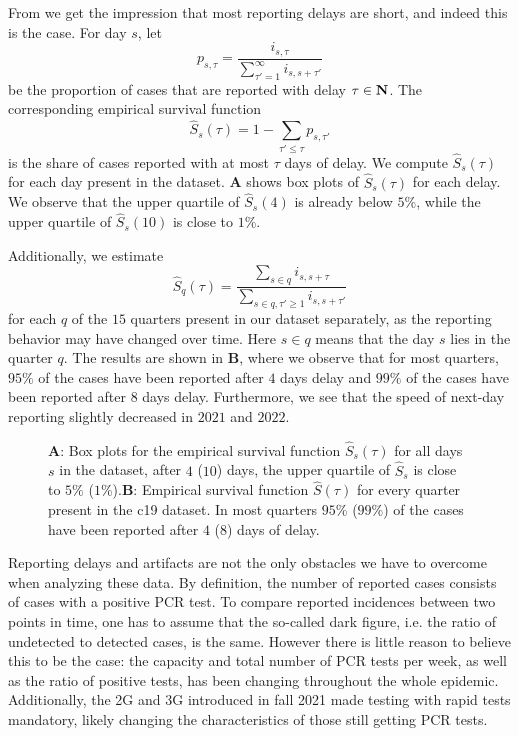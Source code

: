 From  we get the impression that most reporting delays are short, and indeed this is the case. For day $s$, let
$$
    p_{s,\tau} = \frac{i_{s,\tau}}{\sum_{\tau' = 1}^\infty i_{s,s + \tau'}}
$$
be the proportion of cases that are reported with delay $\tau \in\mathbf N$. The corresponding empirical survival function 
$$
    \hat S_{s}(\tau) = 1 - \sum_{\tau' \leq \tau} p_{s,\tau'}
$$
is the share of cases reported with at most $\tau$ days of delay. We compute $\hat S_s(\tau)$ for each day present in the dataset.  \textbf{A} shows box plots of $\hat S_{s}(\tau)$ for each delay. We observe that the upper quartile of $\hat S_s(4)$ is already below $5\%$, while the upper quartile of $\hat S_s(10)$ is close to $1\%$. 

Additionally, we estimate 
$$
    \hat S_{q}(\tau) = \frac{\sum_{s \in q} i_{s,s + \tau}}{\sum_{s \in q, \tau' \geq 1} i_{s, s+ \tau'}}
$$
for each $q$ of the $15$ quarters present in our dataset separately, as the reporting behavior may have changed over time. Here $s\in q$ means that the day $s$ lies in the quarter $q$. The results are shown in  \textbf{B}, where we observe that for most quarters, $95\%$ of the cases have been reported after $4$ days delay and $99\%$ of the cases have been reported after $8$ days delay. 
Furthermore, we see that the speed of next-day reporting slightly decreased in $2021$ and $2022$.

\begin{figure}
    \resizebox{\textwidth}{!}{%
    }
    \caption{\textbf{A}: Box plots for the empirical survival function $\hat S_{s}(\tau)$ for all days $s$ in the dataset, after $4$ ($10$) days, the upper quartile of $\hat S_{s}$ is close to $5\%$ ($1\%$).\textbf{B}: Empirical survival function $\hat S(\tau)$ for every quarter present in the \acrshort{c19} dataset. In most quarters $95\%$ ($99\%$) of the cases have been reported after $4$ ($8$) days of delay.}
    \label{fig:survival_function_rep_tri_incidences}
\end{figure}

Reporting delays and artifacts are not the only obstacles we have to overcome when analyzing these data. By definition, the number of reported cases consists of cases with a positive PCR test. To compare reported incidences between two points in time, one has to assume that the so-called dark figure, i.e. the ratio of undetected to detected cases, is the same. However there is little reason to believe this to be the case: the capacity and total number of PCR tests per week, as well as the ratio of positive tests, has been changing throughout the whole epidemic. Additionally, the 2G and 3G  introduced in fall 2021 made testing with rapid tests mandatory, likely changing the characteristics of those still getting PCR tests.

